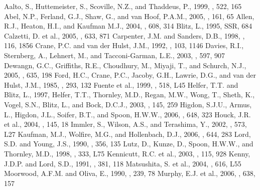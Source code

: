 \documentclass[manuscript]{aastex}
\begin{document}
\begin{thebibliography}{}
 Aalto, S., Huttemeister, S., Scoville, N.Z., and Thaddeus, P., 1999, \aj, 522, 165
 Abel, N.P., Ferland, G.J., Shaw, G., and van Hoof, P.A.M., 2005, \apjs, 161, 65
 Allen, R.J., Heaton, H.I., and Kaufman M.J., 2004, \apj, 608, 314
 Blitz, L., 1995, SSR, 684
 Calzetti, D. et al., 2005, \apj, 633, 871
 Carpenter, J.M. and Sanders, D.B., 1998, \aj, 116, 1856
 Crane, P.C. and van der Hulst, J.M., 1992, \aj, 103, 1146
 Davies, R.I., Sternberg, A., Lehnert, M., and Tacconi-Garman, L.E., 2003, \apj, 597, 907
 Dewangn, G.C., Griffiths, R.E., Choudhury, M., Miyaji, T., and Schurch, N.J., 2005, \apj, 635, 198
 Ford, H.C., Crane, P.C., Jacoby, G.H., Lawrie, D.G., and van der Hulst, J.M., 1985, \apj, 293, 132
 Fuente et al., 1999, \apj, 518, L45
 Helfer, T.T. and Blitz, L., 1997, 
 Helfer, T.T., Thornley, M.D., Regan, M.W., Wong, T., Sheth, K., Vogel, S.N., Blitz, L., and Bock, D.C.J., 2003, \apjs, 145, 259
 Higdon, S.J.U., Armus, L., Higdon, J.L., Soifer, B.T., and Spoon, H.W.W., 2006, \apj, 648, 323
 Houck, J.R. et al., 2004, \apjs, 145, 18
 Immler, S., Wilson, A.S., and Terashima, Y., 2002, \apj, 573, L27
 Kaufman, M.J., Wolfire, M.G., and Hollenbach, D.J., 2006, \apj, 644, 283 
 Lord, S.D. and Young, J.S., 1990, \apj, 356, 135
 Lutz, D., Kunze, D., Spoon, H.W.W., and Thornley, M.D., 1998, \aap, 333, L75
 Kennicutt, R.C. et al., 2003, \pasp, 115, 928
 Kenny, J.D.P. and Lord, S.D., 1991, \apj, 381, 118
 Matsushita, S. et al., 2004, \apj, 616, L55
 Moorwood, A.F.M. and Oliva, E., 1990, \aap, 239, 78
 Murphy, E.J. et al., 2006, \apj, 638, 157

\end{thebibliography}
\end{document}
